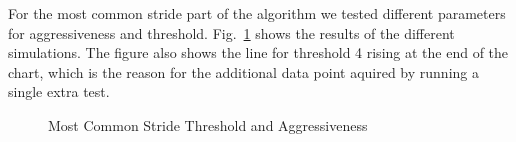 For the most common stride part of the algorithm we tested different parameters
for aggressiveness and threshold. Fig.~\ref{fig:mcs_tweaks} shows the results
of the different simulations.
The figure also shows the line for threshold 4 rising at the end of the chart,
which is the reason for the additional data point aquired by running a single
extra test.


\begin{figure}
	
	\caption{Most Common Stride Threshold and Aggressiveness}
	\label{fig:mcs_tweaks}
\end{figure}
